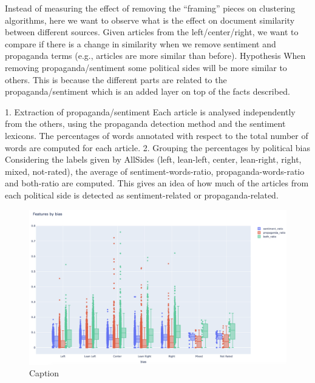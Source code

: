 Instead of measuring the effect of removing the “framing” pieces on clustering algorithms, here we want to observe what is the effect on document similarity between different sources.
Given articles from the left/center/right, we want to compare if there is a change in similarity when we remove sentiment and propaganda terms (e.g., articles are more similar than before).
Hypothesis
When removing propaganda/sentiment some political sides will be more similar to others. This is because the different parts are related to the propaganda/sentiment which is an added layer on top of the facts described.

1. Extraction of propaganda/sentiment
Each article is analysed independently from the others, using the propaganda detection method and the sentiment lexicons.
The percentages of words annotated with respect to the total number of words are computed for each article.
2. Grouping the percentages by political bias
Considering the labels given by AllSides (left, lean-left, center, lean-right, right, mixed, not-rated), the average of sentiment-words-ratio, propaganda-words-ratio and both-ratio are computed. This gives an idea of how much of the articles from each political side is detected as sentiment-related or propaganda-related.

\begin{figure}[!htbp]
    \centering
    \includegraphics{figures/4.3_prop_sent_across_leaning.png}
    \caption{Caption}
    \label{fig:prop_sent_across_leaning}
\end{figure}

